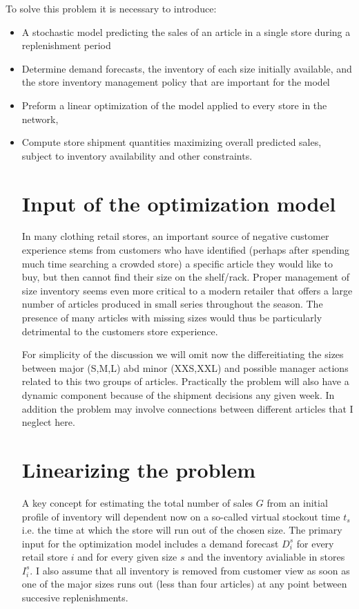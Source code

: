 \documentclass[11pt,fleqn]{book} %
\begin{document}
To solve this problem it is necessary to introduce:
\begin{itemize}
\item A stochastic model predicting the sales of an article in a single store during a replenishment period
\item Determine demand forecasts, the inventory of each size initially available, and the store inventory management policy that are important for the model
\item Preform a linear optimization of the model applied to every store in the network, 
\item Compute store shipment quantities maximizing overall predicted sales, subject to inventory availability and other constraints. 

\section{Input of the optimization model}
In many clothing retail stores, an important source of negative customer experience stems from customers who have identified (perhaps after spending much time searching a crowded store) a specific article they would like to buy, but then cannot find their size on the shelf/rack. Proper management of size inventory seems even more critical to a modern retailer that offers a large number of articles produced in small series throughout the season. The presence of many articles with missing sizes would thus be particularly detrimental to the customers store experience. 
\begin{remark}
For simplicity of the discussion we will omit now the differeitiating the sizes between major (S,M,L) abd minor (XXS,XXL) and possible manager actions related to this two groups of articles. Practically the problem will also have a dynamic component because of the shipment decisions any given week. In addition the problem may involve connections between different articles that I neglect here.
\end{remark}

\section{Linearizing the problem}
A key concept for estimating the total number of sales $G$ from an initial profile of inventory will dependent now on a so-called virtual stockout time $t_s$ i.e. the time at which the store will run out of the chosen size. The primary input for the optimization model includes a demand forecast $D_i^s$ for every retail store $i$ and for every given size $s$ and the inventory avialiable in stores $I_i^s$. I also assume that all inventory is removed from customer view as soon as one of the major sizes runs out (less than four articles) at any point between succesive replenishments.


\end{itemize}
\end{document}
